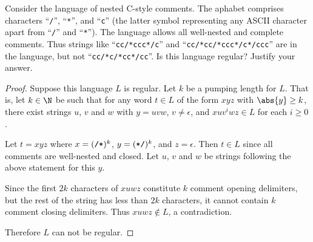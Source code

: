 \documentclass[12pt]{article}
\begin{document}
\begin{problem}
    Consider the language of nested C-style comments.
    The aphabet comprises characters ``\verb|/|'', ``\verb|*|'', and
    ``\verb|c|'' (the latter symbol representing any ASCII character apart
    from ``\verb|/|'' and ``\verb|*|'').
    The language allows all well-nested and complete comments.
    Thus strings like ``\verb|cc/*ccc*/c|'' and
    ``\verb|cc/*cc/*ccc*/c*/ccc|'' are in the language, but not 
    ``\verb|cc/*c/*cc*/cc|''.
    Is this language regular? Justify your answer. 
\end{problem}
\begin{proof}
    Suppose this language $L$ is regular.
    Let $k$ be a pumping length for $L$.
    That is, let $k \in \N$ be such that for any word $t \in L$ of the form
    $xyz$ with $\abs{y} \ge k$, there exist strings $u$, $v$ and $w$ with
    $y = uvw$, $v \ne \epsilon$, and $xuv^iwz \in L$ for each $i \ge 0$.

    Let $t = xyz$ where $x = (\verb|/*|)^k$, $y = (\verb|*/|)^k$, and
    $z = \epsilon$.
    Then $t \in L$ since all comments are well-nested and closed.
    Let $u$, $v$ and $w$ be strings following the above statement for this
    $y$.

    Since the first $2k$ characters of $xuwz$ constitute $k$ comment opening
    delimiters, but the rest of the string has less than $2k$ characters,
    it cannot contain $k$ comment closing delimiters.
    Thus $xuwz \notin L$, a contradiction.

    Therefore $L$ can not be regular.
\end{proof}
\end{document}
